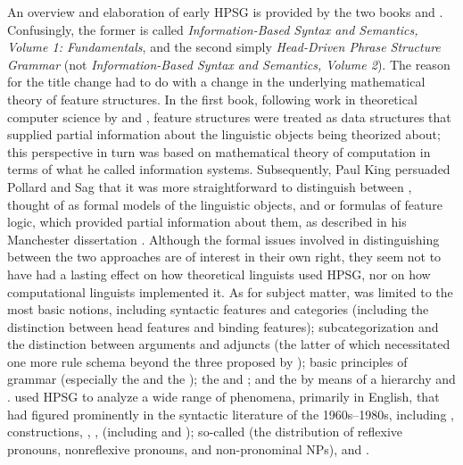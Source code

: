 \documentclass[output=paper
                ,modfonts
                ,nonflat
	        ,collection
	        ,collectionchapter
	        ,collectiontoclongg
 	        ,biblatex
                ,babelshorthands
                ,newtxmath
                ,draftmode
                ,colorlinks, citecolor=brown
]{./langsci/langscibook}
\begin{document}
An overview and elaboration of early HPSG is provided by the two books \citet{ps} and \citet{ps2}. Confusingly, the former is called \textit{Information-Based Syntax and Semantics, Volume 1: Fundamentals}, and the second simply \textit{Head-Driven Phrase Structure Grammar} (not \textit{Information-Based Syntax and Semantics, Volume 2}). The reason for the title change had to do with a change in the underlying mathematical theory of feature structures. In the first book, following work in theoretical computer science by \citet{RoundsKasper1986} and \citet{MoshierRounds1987}, feature structures were treated as data structures that supplied partial information about the linguistic objects being theorized about; this perspective in turn was based on  mathematical theory of computation in terms of what he called information systems. Subsequently, Paul King persuaded Pollard and Sag that it was more straightforward to distinguish between , thought of as formal models of the linguistic objects, and  or formulas of feature logic, which provided partial information about them, as described in his Manchester dissertation \citep{King89}.  Although the formal issues involved in distinguishing between the two approaches are of interest in their own right, they seem not to have had a lasting effect on how theoretical linguists used HPSG, nor on how computational linguists implemented it. As for subject matter, \citet{ps} was limited to the most basic notions, including syntactic features and categories (including the distinction between head features and binding features); subcategorization and the distinction between arguments and adjuncts (the latter of which necessitated one more rule schema beyond the three proposed by \citealt{Pollard85a-u}); basic principles of grammar (especially the  and the ); the  and ; and the  by means of a  hierarchy and . \citet{ps2} used HPSG to analyze a wide range of phenomena, primarily in English, that had figured prominently in the syntactic literature of the 1960s--1980s, including ,  constructions, , ,  (including  and ); so-called  (the distribution of reflexive pronouns, nonreflexive pronouns, and non-pronominal NPs), and .
\end{document}
